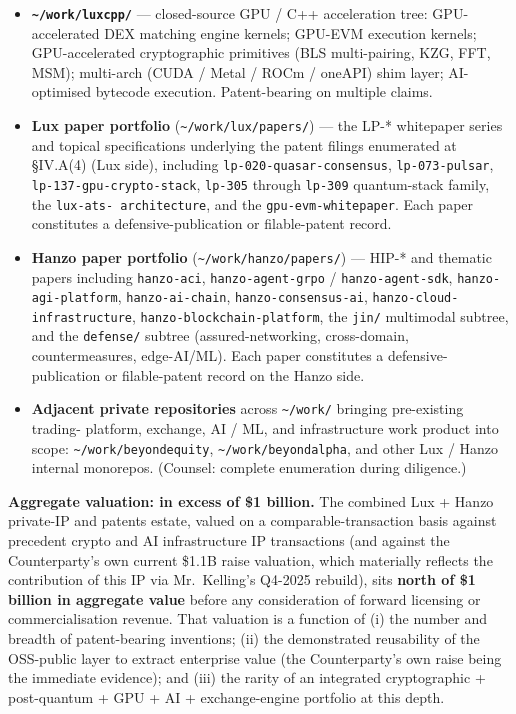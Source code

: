 \documentclass[11pt,letterpaper]{article}
\begin{document}
\begin{itemize}[leftmargin=1.5em,itemsep=0.1em]
\item \textbf{\texttt{\textasciitilde/work/luxcpp/}} --- closed-source
GPU / C++ acceleration tree: GPU-accelerated DEX matching engine
kernels; GPU-EVM execution kernels; GPU-accelerated cryptographic
primitives (BLS multi-pairing, KZG, FFT, MSM); multi-arch (CUDA /
Metal / ROCm / oneAPI) shim layer; AI-optimised bytecode
execution. Patent-bearing on multiple claims.
\item \textbf{Lux paper portfolio} (\texttt{\textasciitilde/work/lux/papers/})
--- the LP-* whitepaper series and topical specifications underlying
the patent filings enumerated at \S IV.A(4) (Lux side), including
\texttt{lp-020-quasar-consensus}, \texttt{lp-073-pulsar},
\texttt{lp-137-gpu-crypto-stack}, \texttt{lp-305} through
\texttt{lp-309} quantum-stack family, the \texttt{lux-ats-
architecture}, and the \texttt{gpu-evm-whitepaper}. Each paper
constitutes a defensive-publication or filable-patent record.
\item \textbf{Hanzo paper portfolio} (\texttt{\textasciitilde/work/hanzo/papers/})
--- HIP-* and thematic papers including \texttt{hanzo-aci},
\texttt{hanzo-agent-grpo} / \texttt{hanzo-agent-sdk},
\texttt{hanzo-agi-platform}, \texttt{hanzo-ai-chain},
\texttt{hanzo-consensus-ai}, \texttt{hanzo-cloud-
infrastructure}, \texttt{hanzo-blockchain-platform}, the
\texttt{jin/} multimodal subtree, and the \texttt{defense/}
subtree (assured-networking, cross-domain, countermeasures,
edge-AI/ML). Each paper constitutes a defensive-publication or
filable-patent record on the Hanzo side.
\item \textbf{Adjacent private repositories} across
\texttt{\textasciitilde/work/} bringing pre-existing trading-
platform, exchange, AI / ML, and infrastructure work product
into scope: \texttt{\textasciitilde/work/beyondequity},
\texttt{\textasciitilde/work/beyondalpha}, and other Lux / Hanzo
internal monorepos. (Counsel: complete enumeration during
diligence.)
\end{itemize}

\textbf{Aggregate valuation: in excess of \$1 billion.} The
combined Lux + Hanzo private-IP and patents estate, valued on a
comparable-transaction basis against precedent crypto and AI
infrastructure IP transactions (and against the Counterparty's
own current \$1.1B raise valuation, which materially reflects the
contribution of this IP via Mr.\ Kelling's Q4-2025 rebuild), sits
\textbf{north of \$1 billion in aggregate value} before any
consideration of forward licensing or commercialisation revenue.
That valuation is a function of (i) the number and breadth of
patent-bearing inventions; (ii) the demonstrated reusability of
the OSS-public layer to extract enterprise value (the
Counterparty's own raise being the immediate evidence); and (iii)
the rarity of an integrated cryptographic + post-quantum + GPU +
AI + exchange-engine portfolio at this depth.
\end{document}
